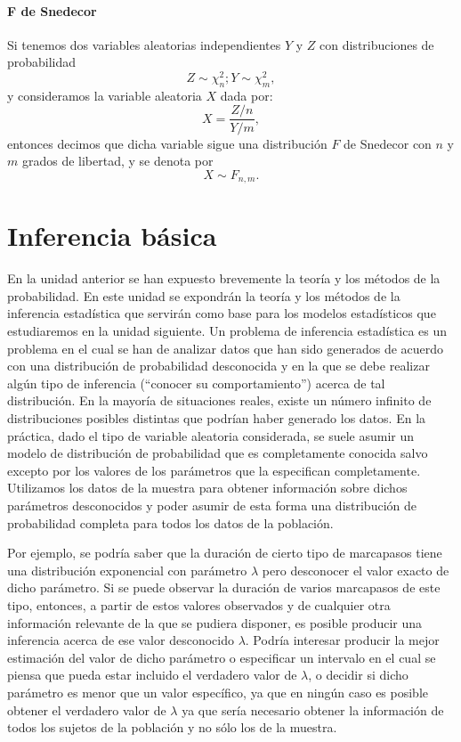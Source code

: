 \documentclass[
]{book}
\begin{document}
\hypertarget{f-de-snedecor}{%
\subsubsection{F de Snedecor}\label{f-de-snedecor}}

Si tenemos dos variables aleatorias independientes \(Y\) y \(Z\) con distribuciones de probabilidad
\[Z \sim \chi^2_n; Y \sim \chi^2_m,\] y consideramos la variable aleatoria \(X\) dada por:
\[X = \frac{Z/n}{Y/m},\] entonces decimos que dicha variable sigue una distribución \(F\) de Snedecor con \(n\) y \(m\) grados de libertad, y se denota por
\[X \sim F_{n,m}.\]

\hypertarget{inferencebasica}{%
\chapter{Inferencia básica}\label{inferencebasica}}

En la unidad anterior se han expuesto brevemente la teoría y los métodos de la probabilidad. En este unidad se expondrán la teoría y los métodos de la inferencia estadística que servirán como base para los modelos estadísticos que estudiaremos en la unidad siguiente. Un problema de inferencia estadística es un problema en el cual se han de analizar datos que han sido generados de acuerdo con una distribución de probabilidad desconocida y en la que se debe realizar algún tipo de inferencia (``conocer su comportamiento'') acerca de tal distribución. En la mayoría de situaciones reales, existe un número infinito de distribuciones posibles distintas que podrían haber generado los datos. En la práctica, dado el tipo de variable aleatoria considerada, se suele asumir un modelo de distribución de probabilidad que es completamente conocida salvo excepto por los valores de los parámetros que la especifican completamente. Utilizamos los datos de la muestra para obtener información sobre dichos parámetros desconocidos y poder asumir de esta forma una distribución de probabilidad completa para todos los datos de la población.

Por ejemplo, se podría saber que la duración de cierto tipo de marcapasos tiene una distribución exponencial con parámetro \(\lambda\) pero desconocer el valor exacto de dicho parámetro. Si se puede observar la duración de varios marcapasos de este tipo, entonces, a partir de estos valores observados y de cualquier otra información relevante de la que se pudiera disponer, es posible producir una inferencia acerca de ese valor desconocido \(\lambda\). Podría interesar producir la mejor estimación del valor de dicho parámetro o especificar un intervalo en el cual se piensa que pueda estar incluido el verdadero valor de \(\lambda\), o decidir si dicho parámetro es menor que un valor específico, ya que en ningún caso es posible obtener el verdadero valor de \(\lambda\) ya que sería necesario obtener la información de todos los sujetos de la población y no sólo los de la muestra.
\end{document}
